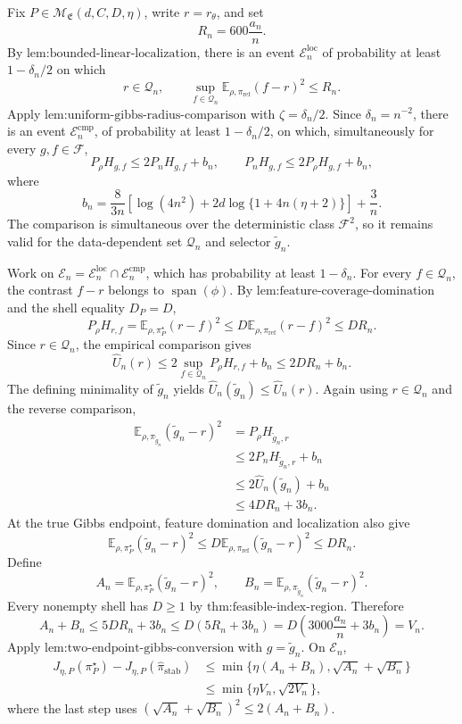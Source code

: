 Fix \(P\in\mathcal M_{\mathfrak E}(d,C,D,\eta)\), write \(r=r_\theta\), and set
\[
R_n=600\frac{a_n}{n}.
\]
By \(\text{lem:bounded-linear-localization}\), there is an event \(\mathcal E_n^{\mathrm{loc}}\) of probability at least \(1-\delta_n/2\) on which
\[
r\in\mathcal Q_n,
\qquad
\sup_{f\in\mathcal Q_n}\mathbb E_{\rho,\pi_{\mathrm{ref}}}(f-r)^2\le R_n.
\]
Apply \(\text{lem:uniform-gibbs-radius-comparison}\) with \(\zeta=\delta_n/2\). Since \(\delta_n=n^{-2}\), there is an event \(\mathcal E_n^{\mathrm{cmp}}\), of probability at least \(1-\delta_n/2\), on which, simultaneously for every \(g,f\in\mathcal F\),
\[
P_\rho H_{g,f}\le2P_nH_{g,f}+b_n,
\qquad
P_nH_{g,f}\le2P_\rho H_{g,f}+b_n,
\]
where
\[
b_n=\frac{8}{3n}\left[\log(4n^2)+2d\log\{1+4n(\eta+2)\}\right]+\frac3n.
\]
The comparison is simultaneous over the deterministic class \(\mathcal F^2\), so it remains valid for the data-dependent set \(\mathcal Q_n\) and selector \(\widetilde g_n\).

Work on \(\mathcal E_n=\mathcal E_n^{\mathrm{loc}}\cap\mathcal E_n^{\mathrm{cmp}}\), which has probability at least \(1-\delta_n\). For every \(f\in\mathcal Q_n\), the contrast \(f-r\) belongs to \(\operatorname{span}(\phi)\). By \(\text{lem:feature-coverage-domination}\) and the shell equality \(D_P=D\),
\[
P_\rho H_{r,f}
=\mathbb E_{\rho,\pi_P^\star}(r-f)^2
\le D\mathbb E_{\rho,\pi_{\mathrm{ref}}}(r-f)^2
\le DR_n.
\]
Since \(r\in\mathcal Q_n\), the empirical comparison gives
\[
\widehat U_n(r)
\le2\sup_{f\in\mathcal Q_n}P_\rho H_{r,f}+b_n
\le2DR_n+b_n.
\]
The defining minimality of \(\widetilde g_n\) yields \(\widehat U_n(\widetilde g_n)\le\widehat U_n(r)\). Again using \(r\in\mathcal Q_n\) and the reverse comparison,
\[
\begin{aligned}
\mathbb E_{\rho,\pi_{\widetilde g_n}}(\widetilde g_n-r)^2
&=P_\rho H_{\widetilde g_n,r}\\
&\le2P_nH_{\widetilde g_n,r}+b_n\\
&\le2\widehat U_n(\widetilde g_n)+b_n\\
&\le4DR_n+3b_n.
\end{aligned}
\]
At the true Gibbs endpoint, feature domination and localization also give
\[
\mathbb E_{\rho,\pi_P^\star}(\widetilde g_n-r)^2
\le D\mathbb E_{\rho,\pi_{\mathrm{ref}}}(\widetilde g_n-r)^2
\le DR_n.
\]
Define
\[
A_n=\mathbb E_{\rho,\pi_P^\star}(\widetilde g_n-r)^2,
\qquad
B_n=\mathbb E_{\rho,\pi_{\widetilde g_n}}(\widetilde g_n-r)^2.
\]
Every nonempty shell has \(D\ge1\) by \(\text{thm:feasible-index-region}\). Therefore
\[
A_n+B_n\le5DR_n+3b_n
\le D(5R_n+3b_n)
=D\left(3000\frac{a_n}{n}+3b_n\right)=V_n.
\]
Apply \(\text{lem:two-endpoint-gibbs-conversion}\) with \(g=\widetilde g_n\). On \(\mathcal E_n\),
\[
\begin{aligned}
J_{\eta,P}(\pi_P^\star)-J_{\eta,P}(\widehat\pi_{\mathrm{stab}})
&\le\min\{\eta(A_n+B_n),\sqrt{A_n}+\sqrt{B_n}\}\\
&\le\min\{\eta V_n,\sqrt{2V_n}\},
\end{aligned}
\]
where the last step uses \((\sqrt{A_n}+\sqrt{B_n})^2\le2(A_n+B_n)\).

